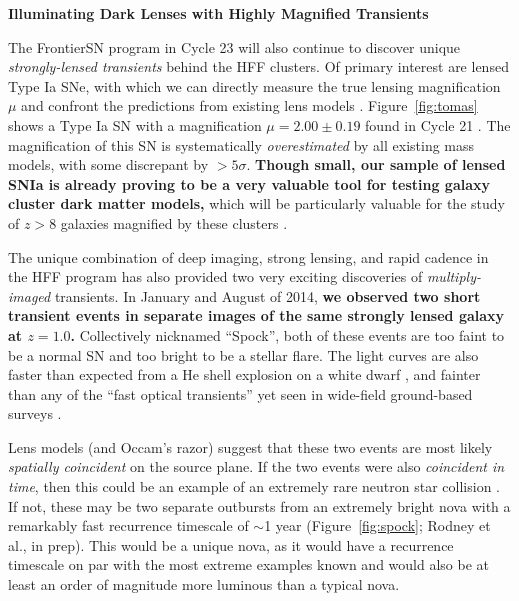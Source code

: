 \documentclass[12pt]{article}
\begin{document}
\pagebreak
\centerline {\bf Illuminating Dark Lenses with Highly Magnified Transients} 
\medskip

The FrontierSN program in Cycle 23 will also continue to discover
unique {\it strongly-lensed transients} behind the HFF clusters. Of
primary interest are lensed Type Ia SNe, with which we can directly
measure the true lensing magnification $\mu$ and confront the
predictions from existing lens models
\citep{Riehm:2011,Patel:2014,Nordin:2014}.  Figure~\ref{fig:tomas}
shows a Type Ia SN with a magnification
$\mu=2.00\pm0.19$ found in Cycle 21 \citep{Rodney:2015b}.  The
magnification of this SN is systematically {\it overestimated} by all
existing mass models, with some discrepant by $>5\sigma$.
{\bf Though small, our sample of lensed SNIa is already proving to be
  a very valuable tool for testing galaxy cluster dark matter models,}
which will be particularly valuable for the study of $z>8$ galaxies
magnified by these clusters
\citep[e.g.][]{Zheng:2012,Coe:2013,Bouwens:2014,Zitrin:2014}.

The unique combination of deep imaging, strong lensing, and rapid
cadence in the HFF program has also provided two very
exciting discoveries of {\it multiply-imaged} transients.  In January
and August of 2014, {\bf we observed two short transient events in
  separate images of the same strongly lensed galaxy at $z=1.0$.}
Collectively nicknamed ``Spock'', both of these events are too faint
to be a normal SN and too bright to be a stellar flare.  The light
curves are also faster than expected from a He shell explosion on a
white dwarf \citep[a ``.Ia'' event][]{Bildsten:2007,Shen:2010}, and
fainter than any of the ``fast optical transients'' yet seen in
wide-field ground-based surveys
\citep[e.g.][]{Kasliwal:2010,Poznanski:2010,Ofek:2010,Drout:2014,Vinko:2015}.

Lens models (and Occam's razor) suggest that these two events are most
likely {\it spatially coincident} on the source plane.  If the two
events were also {\it coincident in time}, then this could be an
example of an extremely rare neutron star collision \citep[a
  ``kilonova'';][]{Tanvir:2013,Kasen:2014,Metzger:2015}.  If not,
these may be two separate outbursts from an extremely bright nova with
a remarkably fast recurrence timescale of $\sim$1 year
(Figure~\ref{fig:spock}; Rodney et al., in prep).  This would be a
unique nova, as it would have a recurrence timescale on par with the
most extreme examples known \citep{Tang:2014} and would also be at
least an order of magnitude more luminous than a typical nova.
\end{document}
